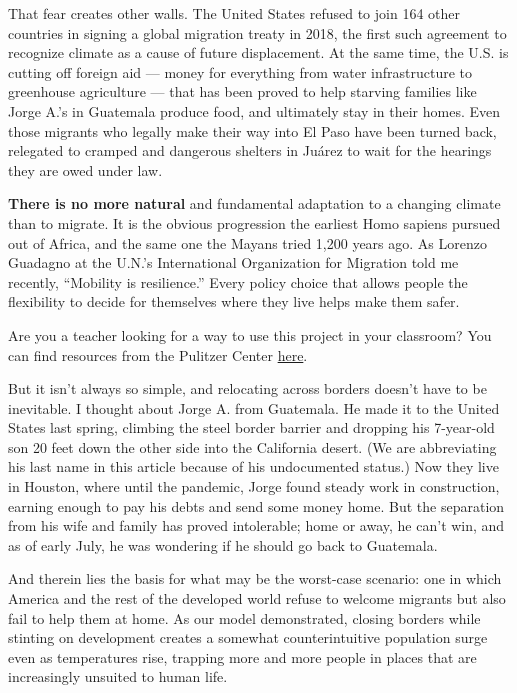 That fear creates other walls. The United States refused to join 164
other countries in signing a global migration treaty in 2018, the first
such agreement to recognize climate as a cause of future displacement.
At the same time, the U.S. is cutting off foreign aid --- money for
everything from water infrastructure to greenhouse agriculture --- that
has been proved to help starving families like Jorge A.'s in Guatemala
produce food, and ultimately stay in their homes. Even those migrants
who legally make their way into El Paso have been turned back, relegated
to cramped and dangerous shelters in Juárez to wait for the hearings
they are owed under law.

\textbf{There is no more natural} and fundamental adaptation to a
changing climate than to migrate. It is the obvious progression the
earliest Homo sapiens pursued out of Africa, and the same one the Mayans
tried 1,200 years ago. As Lorenzo Guadagno at the U.N.'s International
Organization for Migration told me recently, ``Mobility is resilience.''
Every policy choice that allows people the flexibility to decide for
themselves where they live helps make them safer.

Are you a teacher looking for a way to use this project in your
classroom? You can find resources from the Pulitzer Center
\href{https://pulitzercenter.org/event/webinar-educators-exploring-climate-migration-classroom}{here}.

But it isn't always so simple, and relocating across borders doesn't
have to be inevitable. I thought about Jorge A. from Guatemala. He made
it to the United States last spring, climbing the steel border barrier
and dropping his 7-year-old son 20 feet down the other side into the
California desert. (We are abbreviating his last name in this article
because of his undocumented status.) Now they live in Houston, where
until the pandemic, Jorge found steady work in construction, earning
enough to pay his debts and send some money home. But the separation
from his wife and family has proved intolerable; home or away, he can't
win, and as of early July, he was wondering if he should go back to
Guatemala.

And therein lies the basis for what may be the worst-case scenario: one
in which America and the rest of the developed world refuse to welcome
migrants but also fail to help them at home. As our model demonstrated,
closing borders while stinting on development creates a somewhat
counterintuitive population surge even as temperatures rise, trapping
more and more people in places that are increasingly unsuited to human
life.

